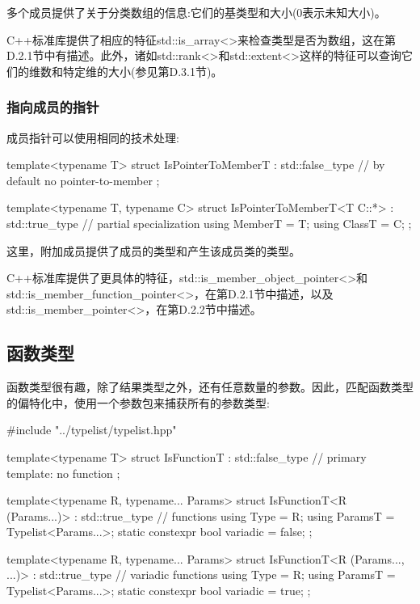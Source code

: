 多个成员提供了关于分类数组的信息:它们的基类型和大小(0表示未知大小)。

C++标准库提供了相应的特征std::is\_array<>来检查类型是否为数组，这在第D.2.1节中有描述。此外，诸如std::rank<>和std::extent<>这样的特征可以查询它们的维数和特定维的大小(参见第D.3.1节)。

\subsubsection{指向成员的指针}

成员指针可以使用相同的技术处理:

\begin{cpp}
template<typename T>
struct IsPointerToMemberT : std::false_type { // by default no pointer-to-member
};

template<typename T, typename C>
struct IsPointerToMemberT<T C::*> : std::true_type { // partial specialization
	using MemberT = T;
	using ClassT = C;
};
\end{cpp}

这里，附加成员提供了成员的类型和产生该成员类的类型。

C++标准库提供了更具体的特征，std::is\_member\_object\_pointer<>和std::is\_member\_function\_pointer<>，在第D.2.1节中描述，以及std::is\_member\_pointer<>，在第D.2.2节中描述。

\subsection{函数类型}

函数类型很有趣，除了结果类型之外，还有任意数量的参数。因此，匹配函数类型的偏特化中，使用一个参数包来捕获所有的参数类型:

\begin{cpp}
#include "../typelist/typelist.hpp"

template<typename T>
struct IsFunctionT : std::false_type { // primary template: no function
};

template<typename R, typename... Params>
struct IsFunctionT<R (Params...)> : std::true_type { // functions
	using Type = R;
	using ParamsT = Typelist<Params...>;
	static constexpr bool variadic = false;
};

template<typename R, typename... Params>
struct IsFunctionT<R (Params..., ...)> : std::true_type { // variadic functions
	using Type = R;
	using ParamsT = Typelist<Params...>;
	static constexpr bool variadic = true;
};
\end{cpp}

